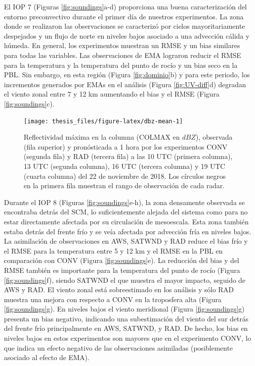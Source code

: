 \documentclass[12pt,oneside,a4paper]{reedthesis}
\begin{document}
El IOP 7 (Figuras \ref{fig:soundings}a-d) proporciona una buena caracterización del entorno preconvectivo durante el primer día de nuestros experimentos. La zona donde se realizaron las observaciones se caracterizó por cielos mayoritariamente despejados y un flujo de norte en niveles bajos asociado a una advección cálida y húmeda. En general, los experimentos muestran un RMSE y un bias similares para todas las variables. Las observaciones de EMA lograron reducir el RMSE para la temperatura y la temperatura del punto de rocío y un bias seco en la PBL. Sin embargo, en esta región (Figura \ref{fig:dominio}b) y para este periodo, los incrementos generados por EMAs en el análisis (Figura \ref{fig:UV-diff}d) degradan el viento zonal entre 7 y 12 km aumentando el bias y el RMSE (Figura \ref{fig:soundings}c).


\begin{figure}
\texttt{[image: thesis\_files/figure-latex/dbz-mean-1]} \caption{Reflectividad máxima en la columna (COLMAX en \(dBZ\)), observada (fila superior) y pronósticada a 1 hora por los experimentos CONV (segunda fila) y RAD (tercera fila) a las 10 UTC (primera columna), 13 UTC (segunda columna), 16 UTC (tercera columna) y 19 UTC (cuarta columna) del 22 de noviembre de 2018. Los círculos negros en la primera fila muestran el rango de observación de cada radar.}\label{fig:dbz-mean}
\end{figure}
Durante el IOP 8 (Figuras \ref{fig:soundings}e-h), la zona densamente observada se encontraba detrás del SCM, lo suficientemente alejada del sistema como para no estar directamente afectada por su circulación de mesoescala. Esta zona también estaba detrás del frente frío y se veía afectada por advección fría en niveles bajos. La asimilación de observaciones en AWS, SATWND y RAD reduce el bias frío y el RMSE para la temperatura entre 5 y 12 km y el RMSE en la PBL en comparación con CONV (Figura \ref{fig:soundings}e). La reducción del bias y del RMSE también es importante para la temperatura del punto de rocío (Figura \ref{fig:soundings}f), siendo SATWND el que muestra el mayor impacto, seguido de AWS y RAD. El viento zonal está sobreestimado en los análisis y sólo RAD muestra una mejora con respecto a CONV en la troposfera alta (Figura \ref{fig:soundings}g). En niveles bajos el viento meridional (Figura \ref{fig:soundings}g) presenta un bias negativo, indicando una subestimación del viento del sur detrás del frente frío principalmente en AWS, SATWND, y RAD. De hecho, los bias en niveles bajos en estos experimentos son mayores que en el experimento CONV, lo que indica un efecto negativo de las observaciones asimiladas (posiblemente asociado al efecto de EMA).
\end{document}

